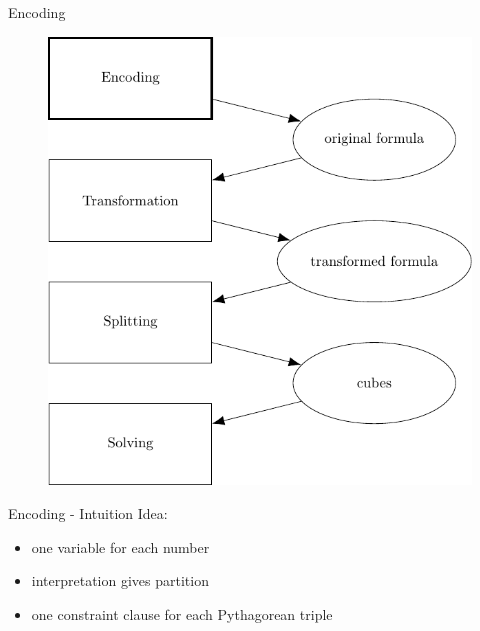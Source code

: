 \documentclass[c,8pt,xcolor...,x11names,usenames,dvipsnames]{beamer}
\begin{document}
\begin{frame}{Encoding}
	\begin{figure}
		\includegraphics[scale=0.65]{images/framework1}
	\end{figure}
\end{frame}

\begin{frame}{Encoding - Intuition}
	Idea:
	\begin{itemize}
		\item one variable for each number
		\pause
		\item interpretation gives partition
		\pause
		\item one constraint clause for each Pythagorean triple
	\end{itemize}
\end{frame}
\end{document}
